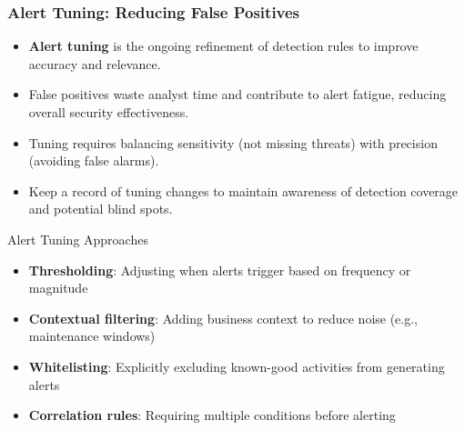 \documentclass{beamer}
\begin{document}
\begin{frame}
    \frametitle{Alert Tuning: Reducing False Positives}
    \begin{itemize}
    \item \textbf{Alert tuning} is the ongoing refinement of detection rules to improve accuracy and relevance.
    \item False positives waste analyst time and contribute to alert fatigue, reducing overall security effectiveness.
    \item Tuning requires balancing sensitivity (not missing threats) with precision (avoiding false alarms).
    \item Keep a record of tuning changes to maintain awareness of detection coverage and potential blind spots.
    \end{itemize}
    
    \begin{block}{Alert Tuning Approaches}
    \scriptsize
    \begin{itemize}
    \item \textbf{Thresholding}: Adjusting when alerts trigger based on frequency or magnitude
    \item \textbf{Contextual filtering}: Adding business context to reduce noise (e.g., maintenance windows)
    \item \textbf{Whitelisting}: Explicitly excluding known-good activities from generating alerts
    \item \textbf{Correlation rules}: Requiring multiple conditions before alerting
    \end{itemize}
    \end{block}
    \end{frame}
    
\end{document}
